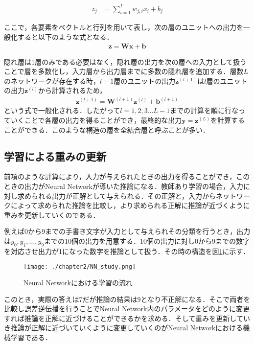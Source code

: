 \begin{align}
z_{j} &= \sum^{I}_{i=1}w_{j,i}x_{i} + b_j
\end{align}

ここで，各要素をベクトルと行列を用いて表し，次の層のユニットへの出力を一般化すると以下のような式となる．
\begin{align}
\bm{z} = \bm{W}\bm{x} + \bm{b}
\end{align}

隠れ層は1層のみである必要はなく，隠れ層の出力を次の層への入力として扱うことで層を多数化し，入力層から出力層までに多数の隠れ層を追加する．層数$L$のネットワークが存在する時，$l+1$層のユニットの出力$\bm{z}^{(l+1)}$は$l$層のユニットの出力$\bm{z}^{(l)}$から計算されるため，
\begin{align}
\bm{z}^{(l+1)} = \bm{W}^{(l+1)}\bm{z}^{(l)} + \bm{b}^{(l+1)}
\label{jundenpan}
\end{align}
という式で一般化される．したがって$l=1,2,3\ldots L-1$までの計算を順に行なっていくことで各層の出力を得ることができ，最終的な出力$\bm{y}=\bm{z}^{(L)}$を計算することができる．このような構造の層を全結合層と呼ぶことが多い．


\subsection{学習による重みの更新}
前項のような計算により，入力が与えられたときの出力を得ることができ，このときの出力がNeural Networkが導いた推論になる．教師あり学習の場合，入力に対し求められる出力が正解として与えられる．その正解と，入力からネットワークによって求められた推論を比較し，より求められる正解に推論が近づくように重みを更新していくのである．

例えば0から9までの手書き文字が入力として与えられその分類を行うとき，出力は$y_0, y_1, \ldots , y_9$までの10個の出力を用意する．10個の出力に対し0から9までの数字を対応させ出力が1になった数字を推論として扱う．その時の構造を図\ref{fig_study}に示す．
\begin{figure}[htbp]
  \begin{center}
    \texttt{[image: ./chapter2/NN\_study.png]}
    \caption{Neural Networkにおける学習の流れ}
    \label{fig_study}
  \end{center}
\end{figure}

このとき，実際の答えは7だが推論の結果は9となり不正解になる．そこで両者を比較し誤差逆伝播を行うことでNeural Network内のパラメータをどのように変更すれば推論を正解に近づけることができるかを求める．そして重みを更新していき推論が正解に近づいていくように変更していくのがNeural Networkにおける機械学習である\cite{sinsou}．

